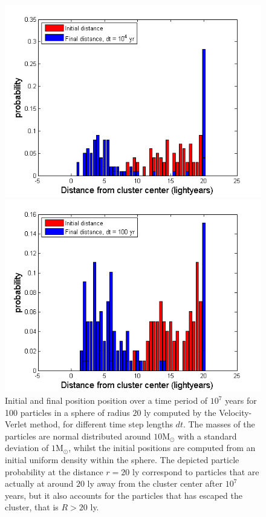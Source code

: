 \begin{figure}[H]
\begin{minipage}{.5\textwidth}
  \includegraphics[width=1\linewidth]{Figures/graphs_VV/pos3_VV.png}
\end{minipage}%
\begin{minipage}{.5\textwidth}
  \centering
  \includegraphics[width=1\linewidth]{Figures/graphs_VV/pos5_VV.png}
\end{minipage}
\caption{
Initial and final position position over a time period of $10^7$ years for 100 particles in a sphere of radius $20$ ly computed by the Velocity-Verlet method, for different time step lengths $dt$.
The masses of the particles are normal distributed around $10{\textrm{M}}_{\odot}$ with a standard deviation of $1{\textrm{M}}_{\odot}$, whilst the initial positions are computed from an initial uniform density within the sphere.
The depicted particle probability at the distance $r=20$ ly correspond to particles that are actually at around $20$ ly away from the cluster center after $10^7$ years, but it also accounts for the particles that has escaped the cluster, that is $R>20$ ly.
}
\label{fig:histograms_VV_diff_time_step}
\end{figure}
